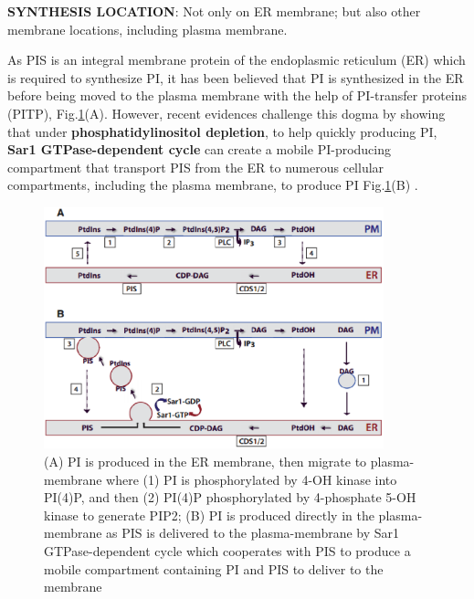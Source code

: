 \begin{mdframed}

{\bf SYNTHESIS LOCATION}: Not only on ER membrane; but also other membrane
locations, including plasma membrane.

As PIS is an integral membrane protein of the endoplasmic reticulum (ER) which
is required to synthesize PI, it has been believed that PI is synthesized in the
ER before being moved to the plasma membrane with the help of PI-transfer proteins (PITP),
Fig.\ref{fig:PtdIns-mobilization}(A). However, recent evidences challenge this
dogma by showing that under {\bf phosphatidylinositol depletion}, to help
quickly producing PI, {\bf Sar1 GTPase-dependent cycle} can create a mobile
PI-producing compartment that transport PIS from the ER to numerous cellular
compartments, including the plasma membrane, to produce PI
Fig.\ref{fig:PtdIns-mobilization}(B) \citep{kim2001, bankaitis2001}.
\end{mdframed}

\begin{figure}[hbt]
  \centerline{\includegraphics[height=7cm,
    angle=0]{./images/PtdIns-mobilization.eps}}
  \caption{(A) PI is produced in the ER membrane, then migrate to
  plasma-membrane where (1) PI is phosphorylated by 4-OH kinase into PI(4)P, and
  then (2) PI(4)P phosphorylated by 4-phosphate 5-OH kinase to generate
  PIP2; (B) PI is produced directly in the plasma-membrane as PIS is
  delivered to the plasma-membrane by Sar1 GTPase-dependent cycle
  which cooperates with PIS to produce a mobile compartment containing PI and
  PIS to deliver to the membrane \citep{bankaitis2001}}
  \label{fig:PtdIns-mobilization}
\end{figure}


